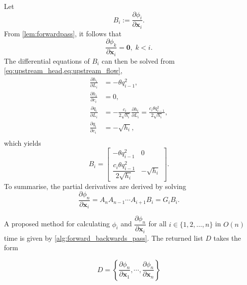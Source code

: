 Let
\begin{equation*}
    B_i:=\frac{\partial \phi_i}{\partial \mathbf{x}_i}.
\end{equation*}
From \autoref{lem:forwardpass}, it follows that
\begin{equation*}
    \frac{\partial \phi_k}{\partial \mathbf{x}_i} = \mathbf{0},\; k<i.
\end{equation*}
The differential equations of $B_i$ can then be solved from \cref{eq:upstream_head,eq:upstream_flow},
\begin{align*}
    \frac{\partial h_i}{\partial L_i} &= -\theta q_{i-1}^2,\\
    \frac{\partial h_i}{\partial c_i} &= 0, \\
    \frac{\partial q_i}{\partial L_i} &= - \frac{c_i}{2\sqrt{h_i}} \frac{\partial h_i}{\partial L_i} = 
    \frac{c_i \theta q_{i-1}^2}{2 \sqrt{h_i}}, \\
    \frac{\partial q_i}{\partial c_i} &= -\sqrt{h_i}, \\
\end{align*}
which yields
\begin{equation}
\label{eq:B_i}
B_i=\begin{bmatrix}
    -\theta q_{i-1}^2 & 0 \\[0.4em]
    \dfrac{c_i \theta q_{i-1}^2}{2 \sqrt{h_i}} & -\sqrt{h_i}
\end{bmatrix}.
\end{equation}
To summarise, the partial derivatives are derived by solving
\begin{equation}
    \label{eq:derivative_equation}
    \frac{\partial \phi_{n}}{\partial \mathbf{x}_i} =
     A_n A_{n-1} \cdots A_{i+1} B_i =
    G_i B_i.
\end{equation}

A proposed method for calculating $\phi_i$ and $\dfrac{\partial \phi_n}{\partial \mathbf{x}_i}$ for all $i\in\{1,2,\dots,n\}$ in $O(n)$ time is given by \autoref{alg:forward_backwards_pass}. The returned list $D$ takes the form

\begin{equation*}
    D = \left\{\frac{\partial \phi_n}{\partial \mathbf{x}_1}, \cdots ,\frac{\partial \phi_n}{\partial \mathbf{x}_n} \right\}
\end{equation*}

